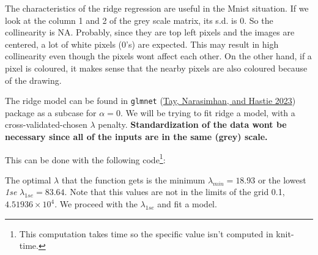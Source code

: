 \documentclass[
  10pt,
]{article}
\newenvironment{Shaded}{\begin{snugshade}}{\end{snugshade}}
\newcommand{\AttributeTok}[1]{\textcolor[rgb]{0.13,0.29,0.53}{#1}}
\newcommand{\CommentTok}[1]{\textcolor[rgb]{0.56,0.35,0.01}{\textit{#1}}}
\newcommand{\ConstantTok}[1]{\textcolor[rgb]{0.56,0.35,0.01}{#1}}
\newcommand{\DecValTok}[1]{\textcolor[rgb]{0.00,0.00,0.81}{#1}}
\newcommand{\FloatTok}[1]{\textcolor[rgb]{0.00,0.00,0.81}{#1}}
\newcommand{\FunctionTok}[1]{\textcolor[rgb]{0.13,0.29,0.53}{\textbf{#1}}}
\newcommand{\NormalTok}[1]{#1}
\newcommand{\OtherTok}[1]{\textcolor[rgb]{0.56,0.35,0.01}{#1}}
\newcommand{\SpecialCharTok}[1]{\textcolor[rgb]{0.81,0.36,0.00}{\textbf{#1}}}
\newcommand{\StringTok}[1]{\textcolor[rgb]{0.31,0.60,0.02}{#1}}
\begin{document}
The characteristics of the ridge regression are useful in the Mnist
situation. If we look at the column 1 and 2 of the grey scale matrix,
its s.d. is 0. So the collinearity is NA. Probably, since they are top
left pixels and the images are centered, a lot of white pixels (\(0\)'s)
are expected. This may result in high collinearity even though the
pixels wont affect each other. On the other hand, if a pixel is
coloured, it makes sense that the nearby pixels are also coloured
because of the drawing.

The ridge model can be found in \texttt{glmnet}
(\protect\hyperlink{ref-glmnet}{Tay, Narasimhan, and Hastie 2023})
package as a subcase for \(\alpha=0\). We will be trying to fit ridge a
model, with a cross-validated-chosen \(\lambda\) penalty.
\textbf{Standardization of the data wont be necessary since all of the
inputs are in the same (grey) scale.}

This can be done with the following code\footnote{This computation takes
  time so the specific value isn't computed in knit-time.}:

\begin{Shaded}
\end{Shaded}

The optimal \(\lambda\) that the function gets is the minimum
\(\lambda_{min}=18.93\) or the lowest \emph{1se}
\(\lambda_{1se}=83.64\). Note that this values are not in the limits of
the grid 0.1, \ensuremath{4.51936\times 10^{4}}. We proceed with the
\(\lambda_{1se}\) and fit a model.
\end{document}
